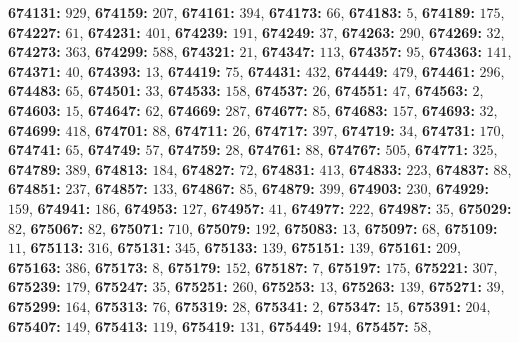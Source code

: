 \textsf{\bfseries 674131:} $929$, \textsf{\bfseries 674159:} $207$, \textsf{\bfseries 674161:} $394$, \textsf{\bfseries 674173:} $66$, \textsf{\bfseries 674183:} $5$, \textsf{\bfseries 674189:} $175$, \textsf{\bfseries 674227:} $61$, \textsf{\bfseries 674231:} $401$, \textsf{\bfseries 674239:} $191$, \textsf{\bfseries 674249:} $37$, \textsf{\bfseries 674263:} $290$, \textsf{\bfseries 674269:} $32$, \textsf{\bfseries 674273:} $363$, \textsf{\bfseries 674299:} $588$, \textsf{\bfseries 674321:} $21$, \textsf{\bfseries 674347:} $113$, \textsf{\bfseries 674357:} $95$, \textsf{\bfseries 674363:} $141$, \textsf{\bfseries 674371:} $40$, \textsf{\bfseries 674393:} $13$, \textsf{\bfseries 674419:} $75$, \textsf{\bfseries 674431:} $432$, \textsf{\bfseries 674449:} $479$, \textsf{\bfseries 674461:} $296$, \textsf{\bfseries 674483:} $65$, \textsf{\bfseries 674501:} $33$, \textsf{\bfseries 674533:} $158$, \textsf{\bfseries 674537:} $26$, \textsf{\bfseries 674551:} $47$, \textsf{\bfseries 674563:} $2$, \textsf{\bfseries 674603:} $15$, \textsf{\bfseries 674647:} $62$, \textsf{\bfseries 674669:} $287$, \textsf{\bfseries 674677:} $85$, \textsf{\bfseries 674683:} $157$, \textsf{\bfseries 674693:} $32$, \textsf{\bfseries 674699:} $418$, \textsf{\bfseries 674701:} $88$, \textsf{\bfseries 674711:} $26$, \textsf{\bfseries 674717:} $397$, \textsf{\bfseries 674719:} $34$, \textsf{\bfseries 674731:} $170$, \textsf{\bfseries 674741:} $65$, \textsf{\bfseries 674749:} $57$, \textsf{\bfseries 674759:} $28$, \textsf{\bfseries 674761:} $88$, \textsf{\bfseries 674767:} $505$, \textsf{\bfseries 674771:} $325$, \textsf{\bfseries 674789:} $389$, \textsf{\bfseries 674813:} $184$, \textsf{\bfseries 674827:} $72$, \textsf{\bfseries 674831:} $413$, \textsf{\bfseries 674833:} $223$, \textsf{\bfseries 674837:} $88$, \textsf{\bfseries 674851:} $237$, \textsf{\bfseries 674857:} $133$, \textsf{\bfseries 674867:} $85$, \textsf{\bfseries 674879:} $399$, \textsf{\bfseries 674903:} $230$, \textsf{\bfseries 674929:} $159$, \textsf{\bfseries 674941:} $186$, \textsf{\bfseries 674953:} $127$, \textsf{\bfseries 674957:} $41$, \textsf{\bfseries 674977:} $222$, \textsf{\bfseries 674987:} $35$, \textsf{\bfseries 675029:} $82$, \textsf{\bfseries 675067:} $82$, \textsf{\bfseries 675071:} $710$, \textsf{\bfseries 675079:} $192$, \textsf{\bfseries 675083:} $13$, \textsf{\bfseries 675097:} $68$, \textsf{\bfseries 675109:} $11$, \textsf{\bfseries 675113:} $316$, \textsf{\bfseries 675131:} $345$, \textsf{\bfseries 675133:} $139$, \textsf{\bfseries 675151:} $139$, \textsf{\bfseries 675161:} $209$, \textsf{\bfseries 675163:} $386$, \textsf{\bfseries 675173:} $8$, \textsf{\bfseries 675179:} $152$, \textsf{\bfseries 675187:} $7$, \textsf{\bfseries 675197:} $175$, \textsf{\bfseries 675221:} $307$, \textsf{\bfseries 675239:} $179$, \textsf{\bfseries 675247:} $35$, \textsf{\bfseries 675251:} $260$, \textsf{\bfseries 675253:} $13$, \textsf{\bfseries 675263:} $139$, \textsf{\bfseries 675271:} $39$, \textsf{\bfseries 675299:} $164$, \textsf{\bfseries 675313:} $76$, \textsf{\bfseries 675319:} $28$, \textsf{\bfseries 675341:} $2$, \textsf{\bfseries 675347:} $15$, \textsf{\bfseries 675391:} $204$, \textsf{\bfseries 675407:} $149$, \textsf{\bfseries 675413:} $119$, \textsf{\bfseries 675419:} $131$, \textsf{\bfseries 675449:} $194$, \textsf{\bfseries 675457:} $58$, 
